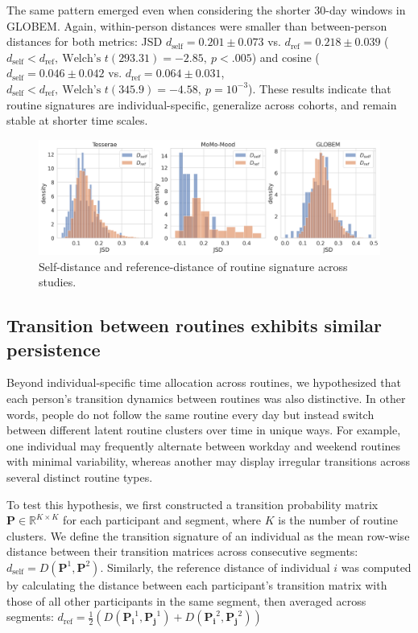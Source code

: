 \documentclass[pdflatex,sn-vancouver,Numbered]{bst/sn-jnl}%
\theoremstyle{thmstyleone}%
\theoremstyle{thmstyletwo}%
\theoremstyle{thmstylethree}%
\newcommand{\dself}[2]{$d_{\text{self}} = #1 \pm #2$}
\newcommand{\dref}[2]{$d_{\text{ref}} = #1 \pm #2$}
\newcommand{\dselfdrefp}[3]{$d_{\text{self}} < d_{\text{ref}},\ \text{Welch's } t(#1) = #2,\ p = #3$}
\newcommand{\dselfdrefpl}[3]{$d_{\text{self}} < d_{\text{ref}},\ \text{Welch's } t(#1) = #2,\ p < #3$}
\begin{document}
The same pattern emerged even when considering the shorter 30-day windows in GLOBEM. Again, within-person distances were smaller than between-person distances for both metrics: JSD \dself{0.201}{0.073} vs. \dref{0.218}{0.039} (\dselfdrefpl{293.31}{-2.85}{.005}) and cosine ( \dself{0.046}{0.042} vs. \dref{0.064}{ 0.031}, \dselfdrefp{345.9}{-4.58}{10^{-3}}). These results indicate that routine signatures are individual-specific, generalize across cohorts, and remain stable at shorter time scales.

\begin{figure}
    \centering
    \includegraphics[width=1\linewidth]{figures/combined_dself_dref_ranked_jsd.png}
    \caption{Self-distance and reference-distance of routine signature across studies.}
    \label{fig:dself_dref}
\end{figure}

\subsection*{Transition between routines exhibits similar persistence}

Beyond individual-specific time allocation across routines, we hypothesized that each person’s transition dynamics between routines was also distinctive. In other words, people do not follow the same routine every day but instead switch between different latent routine clusters over time in unique ways. For example, one individual may frequently alternate between workday and weekend routines with minimal variability, whereas another may display irregular transitions across several distinct routine types.

To test this hypothesis, we first constructed a transition probability matrix 
\(\mathbf{P} \in \mathbb{R}^{K \times K}\) for each participant and segment, 
where \(K\) is the number of routine clusters. We define the transition signature of an individual as the mean row-wise 
distance between their transition matrices across consecutive segments: 
\(d_{\mathrm{self}} = 
D(\mathbf{P}^1, \mathbf{P}^{2}) \). Similarly, the reference distance of individual $i$ was computed by calculating the distance between each participant’s transition matrix with those of all other participants in the same segment, then averaged across 
segments: 
\(d_{\mathrm{ref}} = \frac{1}{2} (
D(\mathbf{P_i}^1, \mathbf{P_j}^{1}) + D(\mathbf{P_i}^2, \mathbf{P_j}^{2}))\)
\end{document}
